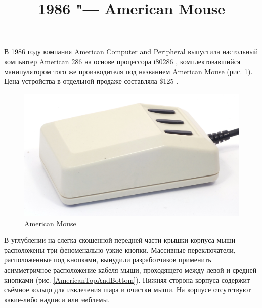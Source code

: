 \documentclass[11pt, a4paper]{article}
\begin{document}
\title{1986 "--- American Mouse}
\date{}
\maketitle

В 1986 году компания American Computer and Peripheral выпустила настольный компьютер American 286 на основе процессора i80286 \cite{adv}, комплектовавшийся манипулятором того же производителя под названием American Mouse (рис. \ref{fig:AmericanPic}). Цена устройства в отдельной продаже составляла \$125 \cite{review}.

\begin{figure}[h]
    \centering
    \includegraphics[scale=0.7]{1986_american_mouse/pic_30.jpg}
    \caption{American Mouse}
    \label{fig:AmericanPic}
\end{figure}

В углублении на слегка скошенной передней части крышки корпуса мыши расположены три феноменально узкие кнопки. Массивные переключатели, расположенные под кнопками, вынудили разработчиков применить асимметричное расположение кабеля мыши, проходящего между левой и средней кнопками (рис. \ref{AmericanTopAndBottom}). Нижняя сторона корпуса содержит съёмное кольцо для извлечения шара и очистки мыши. На корпусе отсутствуют какие-либо надписи или эмблемы.
\end{document}
